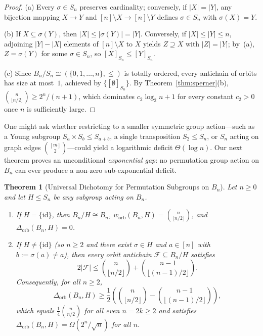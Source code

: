 \documentclass[11pt,a4paper]{article}
\newtheorem{theorem}{Theorem}[section]
\theoremstyle{definition}
\newcommand{\Bn}{B_n}
\newcommand{\Sn}{S_n}
\newcommand{\worb}{w_{\mathrm{orb}}}
\newcommand{\Dorb}{\Delta_{\mathrm{orb}}}
\begin{document}
\begin{proof}
(a) Every $\sigma \in \Sn$ preserves cardinality; conversely, if $|X| = |Y|$, any bijection mapping $X \to Y$ and $[n]\setminus X \to [n]\setminus Y$ defines $\sigma \in \Sn$ with $\sigma(X) = Y$.

(b) If $X \subseteq \sigma(Y)$, then $|X| \le |\sigma(Y)| = |Y|$. Conversely, if $|X| \le |Y| \le n$, adjoining $|Y|-|X|$ elements of $[n]\setminus X$ to $X$ yields $Z \supseteq X$ with $|Z| = |Y|$; by~(a), $Z = \sigma(Y)$ for some $\sigma \in \Sn$, so $[X]_{\Sn} \le [Y]_{\Sn}$.

(c) Since $\Bn/\Sn \cong (\{0,1,\dots,n\},\le)$ is totally ordered, every antichain of orbits has size at most~$1$, achieved by $\{[\emptyset]_{\Sn}\}$. By Theorem~\ref{thm:sperner}(b), $\binom{n}{\lfloor n/2 \rfloor} \ge 2^n/(n+1)$, which dominates $c_2 \log_2 n + 1$ for every constant $c_2 > 0$ once $n$ is sufficiently large.
\end{proof}

One might ask whether restricting to a smaller symmetric group action---such as a Young subgroup $S_a \times S_b \le S_{a+b}$, a single transposition $S_2 \le \Sn$, or $\Sn$ acting on graph edges $\binom{[m]}{2}$---could yield a logarithmic deficit $\Theta(\log n)$. Our next theorem proves an unconditional \emph{exponential gap}: no permutation group action on $\Bn$ can ever produce a non-zero sub-exponential deficit.

\begin{theorem}[Universal Dichotomy for Permutation Subgroups on $\Bn$]\label{thm:universal-dichotomy}
Let $n \ge 0$ and let $H \le \Sn$ be any subgroup acting on $\Bn$.
\begin{enumerate}
  \item[(a)] If $H = \{\mathrm{id}\}$, then $\Bn/H \cong \Bn$, $\worb(\Bn, H) = \binom{n}{\lfloor n/2 \rfloor}$, and $\Dorb(\Bn, H) = 0$.
  \item[(b)] If $H \neq \{\mathrm{id}\}$ (so $n \ge 2$ and there exist $\sigma \in H$ and $a \in [n]$ with $b := \sigma(a) \neq a$), then every orbit antichain $\mathcal{F} \subseteq \Bn/H$ satisfies
  \begin{equation}\label{eq:universal-bound}
    2|\mathcal{F}| \le \binom{n}{\lfloor n/2 \rfloor} + \binom{n-1}{\lfloor (n-1)/2 \rfloor}.
  \end{equation}
  Consequently, for all $n \ge 2$,
  \[
    \Dorb(\Bn, H) \ge \frac{1}{2}\left(\binom{n}{\lfloor n/2 \rfloor} - \binom{n-1}{\lfloor (n-1)/2 \rfloor}\right),
  \]
  which equals $\frac{1}{4}\binom{n}{n/2}$ for all even $n = 2k \ge 2$ and satisfies $\Dorb(\Bn, H) = \Omega(2^n/\sqrt{n})$ for all $n$.
\end{enumerate}
\end{theorem}
\end{document}
